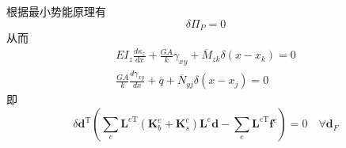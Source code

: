 \documentclass[forprint]{WHUBachelor}
\begin{document}
根据最小势能原理有
\begin{equation} 
\delta \Pi_{P}=0
 \end{equation}
从而
\begin{equation} 
\begin{array}{l}{E I_{z} \frac{d \kappa_{z}}{d x}+\frac{G A}{k} \gamma_{x y}+\overline{M}_{z k} \delta\left(x-x_{k}\right)=0} \\ {\frac{G A}{k} \frac{d \gamma_{x y}}{d x}+\overline{q}+\overline{N}_{y j} \delta\left(x-x_{j}\right)=0}\end{array}
 \end{equation}
即
\begin{equation} 
\delta \boldsymbol{d}^{\mathrm{T}}\left(\sum_{e} \boldsymbol{L}^{e \mathrm{T}}\left(\boldsymbol{K}_{b}^{e}+\boldsymbol{K}_{s}^{e}\right) \boldsymbol{L}^{e} \boldsymbol{d}-\sum_{e} \boldsymbol{L}^{e \mathrm{T}} \boldsymbol{f}^{e}\right)=0 \quad \forall \boldsymbol{d}_{F}
 \end{equation}
\end{document}
